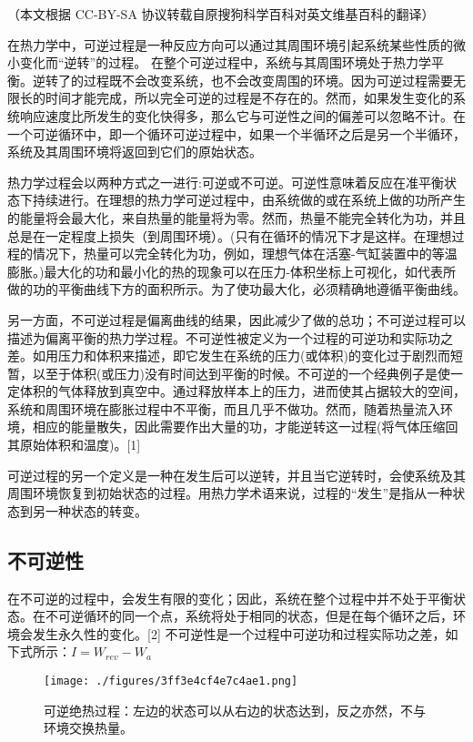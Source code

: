 
（本文根据 CC-BY-SA 协议转载自原搜狗科学百科对英文维基百科的翻译）

在热力学中，可逆过程是一种反应方向可以通过其周围环境引起系统某些性质的微小变化而“逆转”的过程。 在整个可逆过程中，系统与其周围环境处于热力学平衡。逆转了的过程既不会改变系统，也不会改变周围的环境。因为可逆过程需要无限长的时间才能完成，所以完全可逆的过程是不存在的。然而，如果发生变化的系统响应速度比所发生的变化快得多，那么它与可逆性之间的偏差可以忽略不计。在一个可逆循环中，即一个循环可逆过程中，如果一个半循环之后是另一个半循环，系统及其周围环境将返回到它们的原始状态。

热力学过程会以两种方式之一进行:可逆或不可逆。可逆性意味着反应在准平衡状态下持续进行。在理想的热力学可逆过程中，由系统做的或在系统上做的功所产生的能量将会最大化，来自热量的能量将为零。然而，热量不能完全转化为功，并且总是在一定程度上损失（到周围环境）。(只有在循环的情况下才是这样。在理想过程的情况下，热量可以完全转化为功，例如，理想气体在活塞-气缸装置中的等温膨胀。)最大化的功和最小化的热的现象可以在压力-体积坐标上可视化，如代表所做的功的平衡曲线下方的面积所示。为了使功最大化，必须精确地遵循平衡曲线。

另一方面，不可逆过程是偏离曲线的结果，因此减少了做的总功；不可逆过程可以描述为偏离平衡的热力学过程。不可逆性被定义为一个过程的可逆功和实际功之差。如用压力和体积来描述，即它发生在系统的压力(或体积)的变化过于剧烈而短暂，以至于体积(或压力)没有时间达到平衡的时候。不可逆的一个经典例子是使一定体积的气体释放到真空中。通过释放样本上的压力，进而使其占据较大的空间，系统和周围环境在膨胀过程中不平衡，而且几乎不做功。然而，随着热量流入环境，相应的能量散失，因此需要作出大量的功，才能逆转这一过程(将气体压缩回其原始体积和温度)。[1]

可逆过程的另一个定义是一种在发生后可以逆转，并且当它逆转时，会使系统及其周围环境恢复到初始状态的过程。用热力学术语来说，过程的“发生”是指从一种状态到另一种状态的转变。

\subsection{不可逆性}
在不可逆的过程中，会发生有限的变化；因此，系统在整个过程中并不处于平衡状态。在不可逆循环的同一个点，系统将处于相同的状态，但是在每个循环之后，环境会发生永久性的变化。[2] 不可逆性是一个过程中可逆功和过程实际功之差，如下式所示：$I = W_{rev} -W_{a}$
\begin{figure}[ht]
\centering
\texttt{[image: ./figures/3ff3e4cf4e7c4ae1.png]}
\caption{可逆绝热过程：左边的状态可以从右边的状态达到，反之亦然，不与环境交换热量。} \label{fig_KNGC_1}
\end{figure}

